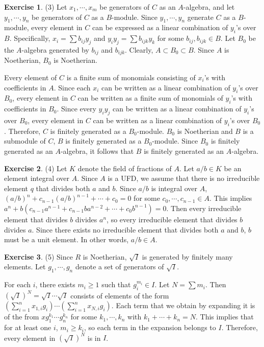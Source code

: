 \documentclass[12pt, psamsfonts]{amsart}
\theoremstyle{definition}
\newtheorem*{exer}{Exercise}
\theoremstyle{remark}
\numberwithin{equation}{section}
\begin{document}
\begin{exer}{(3)}
  Let $x_1, \cdots, x_m$ be generators of $C$ as an $A$-algebra, and let $y_1, \cdots, y_n$ be generators of $C$ as a $B$-module.
  Since $y_1, \cdots, y_n$ generate $C$ as a $B$-module, every element in $C$ can be expressed as a linear combination of $y_i$'s over $B$.
  Specifically, $x_i = \sum b_{ij} y_j$ and $y_iy_j = \sum b_{ijk}y_k$ for some $b_{ij}, b_{ijk} \in B$.
  Let $B_0$ be the $A$-algebra generated by $b_{ij}$ and $b_{ijk}$.
  Clearly, $A \subset B_0 \subset B$.
  Since $A$ is Noetherian, $B_0$ is Noetherian.

  Every element of $C$ is a finite sum of monomials consisting of $x_i$'s with coefficients in $A$.
  Since each $x_i$ can be written as a linear combination of $y_i$'s over $B_0$, every element in $C$ can be written as a finite sum of monomials of $y_i$'s with coefficients in $B_0$.
  Since every $y_iy_j$ can be written as a linear combination of $y_i$'s over $B_0$, every element in $C$ can be written as a linear combination of $y_i$'s over $B_0$.
  Therefore, $C$ is finitely generated as a $B_0$-module.
  $B_0$ is Noetherian and $B$ is a submodule of $C$, $B$ is finitely generated as a $B_0$-module.
  Since $B_0$ is finitely generated as an $A$-algebra, it follows that $B$ is finitely generated as an $A$-algebra.
\end{exer}

\begin{exer}{(4)}
  Let $K$ denote the field of fractions of $A$.
  Let $a / b \in K$ be an element integral over $A$.
  Since $A$ is a UFD, we assume that there is no irreducible element $q$ that divides both $a$ and $b$.
  Since $a / b$ is integral over $A$, $(a / b)^n + c_{n - 1}(a / b)^{n - 1} + \cdots + c_0 = 0$ for some $c_0, \cdots, c_{n - 1} \in A$.
  This implies $a^n + b(c_{n - 1}a^{n - 1} + c_{n - 1}ba^{n - 2} + \cdots + c_0b^{n - 1}) = 0$.
  Then every irreducible element that divides $b$ divides $a^n$, so every irreducible element that divides $b$ divides $a$.
  Since there exists no irreducible element that divides both $a$ and $b$, $b$ must be a unit element.
  In other words, $a / b \in A$.
\end{exer}

\begin{exer}{(5)}
  Since $R$ is Noetherian, $\sqrt{I}$ is generated by finitely many elements.
  Let $g_1, \cdots, g_n$ denote a set of generators of $\sqrt{I}$.

  For each $i$, there exists $m_i \geq 1$ such that $g_i^{m_i} \in I$.
  Let $N = \sum m_i$.
  Then $(\sqrt{I})^N = \sqrt{I} \cdots \sqrt{I}$ consists of elements of the form $(\sum_{i=1}^{n} x_{1, i}g_{i}) \cdots (\sum_{i=1}^{n} x_{N, i}g_{i})$.
  Each term that we obtain by expanding it is of the from $xg_1^{k_1} \cdots g_n^{k_n}$ for some $k_1, \cdots, k_n$ with $k_1 + \cdots + k_n = N$.
  This implies that for at least one $i$, $m_i \geq k_i$, so each term in the expansion belongs to $I$.
  Therefore, every element in $(\sqrt{I})^N$ is in $I$.
\end{exer}
\end{document}
